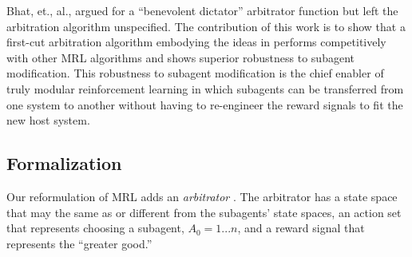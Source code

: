 Bhat, et., al., \cite{bhat2006on-the-difficulty} argued for a ``benevolent dictator'' arbitrator function but left the arbitration algorithm unspecified.  The contribution of this work is to show that a first-cut arbitration algorithm embodying the ideas in \cite{bhat2006on-the-difficulty} performs competitively with other MRL algorithms and shows superior robustness to subagent modification.  This robustness to subagent modification is the chief enabler of truly modular reinforcement learning in which subagents can be transferred from one system to another without having to re-engineer the reward signals to fit the new host system.





\subsection{Formalization}

Our reformulation of MRL adds an {\em arbitrator} \cite{brooks1986a-robust}.  The arbitrator has a state space that may the same as or different from the subagents' state spaces, an action set that represents choosing a subagent, $A_0 = {1 ... n}$, and a reward signal that represents the ``greater good.''

